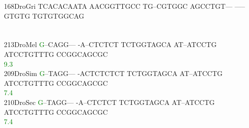 \documentclass[11pt,twoside,reqno,a4paper]{article}
\begin{document}
{168\hspace*{1\charwidth}DroGri	TCACACAATA	AACGGTTGCC	TG--CGTGGC	AGCCTGT---	-----GTGTG	TGTGTGGCAG	\\
\hspace*{4\charwidth}\hspace*{7\charwidth}\hspace*{1\charwidth}\hspace*{1\charwidth}\hspace*{1\charwidth}\hspace*{1\charwidth}\hspace*{1\charwidth}\hspace*{1\charwidth}\\
\\
213\hspace*{1\charwidth}DroMel	\textcolor{Green}{G}--CAGG---	-A--CTCTCT	TCTGGTAGCA	AT--ATCCTG	ATCCTGTTTG	CCGGCAGCGC	\\
\hspace*{4\charwidth}\hspace*{7\charwidth}\hspace*{0\charwidth}\textcolor{Green}{9.3}\hspace*{1\charwidth}\hspace*{1\charwidth}\hspace*{1\charwidth}\hspace*{1\charwidth}\hspace*{1\charwidth}\hspace*{1\charwidth}\\
209\hspace*{1\charwidth}DroSim	\textcolor{Green}{G}--TAGG---	-ACTCTCTCT	TCTGGTAGCA	AT--ATCCTG	ATCCTGTTTG	CCGGCAGCGC	\\
\hspace*{4\charwidth}\hspace*{7\charwidth}\hspace*{0\charwidth}\textcolor{Green}{7.4}\hspace*{1\charwidth}\hspace*{1\charwidth}\hspace*{1\charwidth}\hspace*{1\charwidth}\hspace*{1\charwidth}\hspace*{1\charwidth}\\
210\hspace*{1\charwidth}DroSec	\textcolor{Green}{G}--TAGG---	-A--CTCTCT	TCTGGTAGCA	AT--ATCCTG	ATCCTGTTTG	CCGGCAGCGC	\\
\hspace*{4\charwidth}\hspace*{7\charwidth}\hspace*{0\charwidth}\textcolor{Green}{7.4}\hspace*{1\charwidth}\hspace*{1\charwidth}\hspace*{1\charwidth}\hspace*{1\charwidth}\hspace*{1\charwidth}\hspace*{1\charwidth}\\
}
\end{document}
